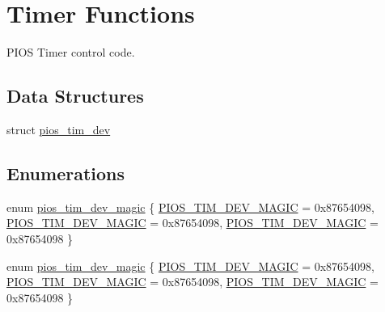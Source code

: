 \hypertarget{group___p_i_o_s___t_i_m}{\section{\-Timer \-Functions}
\label{group___p_i_o_s___t_i_m}
}


\-P\-I\-O\-S \-Timer control code.  


\subsection*{\-Data \-Structures}
\begin{DoxyCompactItemize}
\item 
struct \hyperlink{structpios__tim__dev}{pios\-\_\-tim\-\_\-dev}
\end{DoxyCompactItemize}
\subsection*{\-Enumerations}
\begin{DoxyCompactItemize}
\item 
enum \hyperlink{group___p_i_o_s___t_i_m_ga7d425167804fd43bc76fe29c11386a6c}{pios\-\_\-tim\-\_\-dev\-\_\-magic} \{ \hyperlink{group___p_i_o_s___t_i_m_gga7d425167804fd43bc76fe29c11386a6ca0c5dc16440e893937250b8ab7e88f777}{\-P\-I\-O\-S\-\_\-\-T\-I\-M\-\_\-\-D\-E\-V\-\_\-\-M\-A\-G\-I\-C} =  0x87654098, 
\hyperlink{group___p_i_o_s___t_i_m_gga7d425167804fd43bc76fe29c11386a6ca0c5dc16440e893937250b8ab7e88f777}{\-P\-I\-O\-S\-\_\-\-T\-I\-M\-\_\-\-D\-E\-V\-\_\-\-M\-A\-G\-I\-C} =  0x87654098, 
\hyperlink{group___p_i_o_s___t_i_m_gga7d425167804fd43bc76fe29c11386a6ca0c5dc16440e893937250b8ab7e88f777}{\-P\-I\-O\-S\-\_\-\-T\-I\-M\-\_\-\-D\-E\-V\-\_\-\-M\-A\-G\-I\-C} =  0x87654098
 \}
\item 
enum \hyperlink{group___p_i_o_s___t_i_m_ga7d425167804fd43bc76fe29c11386a6c}{pios\-\_\-tim\-\_\-dev\-\_\-magic} \{ \hyperlink{group___p_i_o_s___t_i_m_gga7d425167804fd43bc76fe29c11386a6ca0c5dc16440e893937250b8ab7e88f777}{\-P\-I\-O\-S\-\_\-\-T\-I\-M\-\_\-\-D\-E\-V\-\_\-\-M\-A\-G\-I\-C} =  0x87654098, 
\hyperlink{group___p_i_o_s___t_i_m_gga7d425167804fd43bc76fe29c11386a6ca0c5dc16440e893937250b8ab7e88f777}{\-P\-I\-O\-S\-\_\-\-T\-I\-M\-\_\-\-D\-E\-V\-\_\-\-M\-A\-G\-I\-C} =  0x87654098, 
\hyperlink{group___p_i_o_s___t_i_m_gga7d425167804fd43bc76fe29c11386a6ca0c5dc16440e893937250b8ab7e88f777}{\-P\-I\-O\-S\-\_\-\-T\-I\-M\-\_\-\-D\-E\-V\-\_\-\-M\-A\-G\-I\-C} =  0x87654098
 \}
\end{DoxyCompactItemize}
